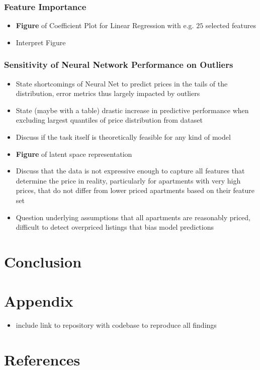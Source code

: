\documentclass[12pt, letterpaper]{article}
\begin{document}
\subsubsection{Feature Importance} %
\begin{itemize}
    \item \textbf{Figure} of Coefficient Plot for Linear Regression with e.g. $25$ selected features
    \item Interpret Figure
\end{itemize}

\subsubsection{Sensitivity of Neural Network Performance on Outliers} %
\begin{itemize}
    \item State shortcomings of Neural Net to predict prices in the tails of the distribution, error metrics thus largely impacted by outliers
    \item State (maybe with a table) drastic increase in predictive performance when excluding largest quantiles of price distribution from dataset
    \item Discuss if the task itself is theoretically feasible for any kind of model
    \item \textbf{Figure} of latent space representation
    \item Discuss that the data is not expressive enough to capture all features that determine the price in reality, particularly for apartments with very high prices, that do not differ from lower priced apartments based on their feature set
    \item Question underlying assumptions that all apartments are reasonably priced, difficult to detect overpriced listings that bias model predictions
\end{itemize}


\section{Conclusion} %


\section{Appendix}
\begin{itemize}
    \item include link to repository with codebase to reproduce all findings
\end{itemize}


\section{References}
\end{document}
